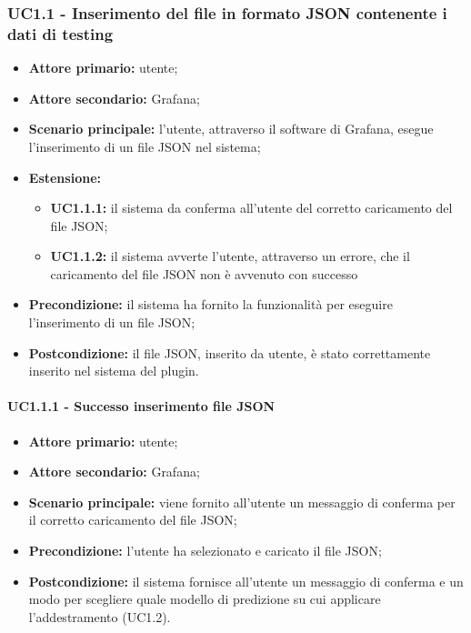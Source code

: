 \documentclass{article}
\begin{document}
	\subsubsection{UC1.1 - Inserimento del file in formato JSON contenente i dati di testing}
	\begin{itemize}
		\item \textbf{Attore primario:} utente;
		\item \textbf{Attore secondario:} Grafana;
		\item \textbf{Scenario principale:} l'utente, attraverso il software di Grafana, esegue l'inserimento di un file JSON nel sistema;
		\item \textbf{Estensione:}
			\begin{itemize}
				\item \textbf{UC1.1.1:} il sistema da conferma all'utente del corretto caricamento del file JSON;
				\item \textbf{UC1.1.2:} il sistema avverte l'utente, attraverso un errore, che il caricamento del file JSON non è avvenuto con successo
			\end{itemize}
		\item \textbf{Precondizione:} il sistema ha fornito la funzionalità per eseguire l'inserimento di un file JSON;
		\item \textbf{Postcondizione:} il file JSON, inserito da utente, è stato correttamente inserito nel sistema del plugin.
	\end{itemize}

	\paragraph{UC1.1.1 - Successo inserimento file JSON}
	\begin{itemize}
		\item \textbf{Attore primario:} utente;
		\item \textbf{Attore secondario:} Grafana;
		\item \textbf{Scenario principale:} viene fornito all'utente un messaggio di conferma per il corretto caricamento del file JSON;
		\item \textbf{Precondizione:} l'utente ha selezionato e caricato il file JSON;
		\item \textbf{Postcondizione:} il sistema fornisce all'utente un messaggio di conferma e un modo per scegliere quale modello di predizione su cui applicare l'addestramento (UC1.2).
	\end{itemize}
\end{document}
